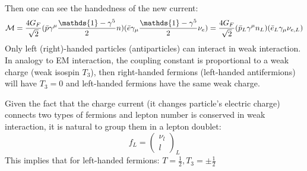 Then one can see the handedness of the new current:
\begin{equation}
    \CM = \frac{4G_F}{\sqrt{2}}(\bar{p} \gamma^\mu\frac{\mathds{1} - \gamma^5}{2} n) (\bar{e} \gamma_\mu\frac{\mathds{1} - \gamma^5}{2} \nu_e) 
    = \frac{4G_F}{\sqrt{2}}(\bar{p}_L \gamma^\mu n_L)(\bar{e}_L \gamma_\mu \nu_{e,L})
\end{equation}
Only left (right)-handed particles (antiparticles) can interact in weak interaction.
In analogy to EM interaction, the coupling constant is proportional to a weak
charge (weak isospin $T_3$), then right-handed fermions (left-handed antifermions) 
will have $T_3 = 0$ and left-handed fermions have the same weak charge. 

Given the fact that the charge current (it changes particle's electric charge) 
connects two types of fermions and lepton number is conserved in weak interaction, 
it is natural to group them in a lepton doublet: 
\begin{equation}
    f_L = \begin{pmatrix} \nu_l \\ l \end{pmatrix}_L
\end{equation}
This implies that for left-handed fermions: $T=\frac{1}{2}, T_3 = \pm\frac{1}{2}$ 


